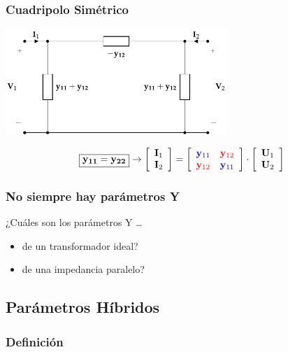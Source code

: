 \subsubsection{Cuadripolo Simétrico}
\label{sec:orgbe5cf36}


\includegraphics[height=4cm]{../figs/circuitoEquivalenteYSimetrico.pdf}



\[
\boxed{\mathbf{y_{11}} = \mathbf{y_{22}}}
\rightarrow
\left[
    \begin{array}{c}
      \mathbf{I}_1\\
      \mathbf{I}_2
    \end{array}
  \right] =
  \left[
    \begin{array}{cc}
      \color{blue}{\mathbf{y}_{11}} & \color{red}{\mathbf{y}_{12}}\\
      \color{red}{\mathbf{y}_{12}} & \color{blue}{\mathbf{y}_{11}}
    \end{array}
  \right] \cdot
  \left[
    \begin{array}{c}
      \mathbf{U}_1\\
      \mathbf{U}_2
    \end{array}
  \right]
\]


\subsubsection{No siempre hay parámetros Y}
\label{sec:org4af051f}

¿Cuáles son los parámetros Y \ldots{} 

\begin{itemize}
\item de un transformador ideal?
\item de una impedancia paralelo?
\end{itemize}

\subsection{Parámetros Híbridos}
\label{sec:org7054e38}
\subsubsection{Definición}
\label{sec:orgafed8ae}

